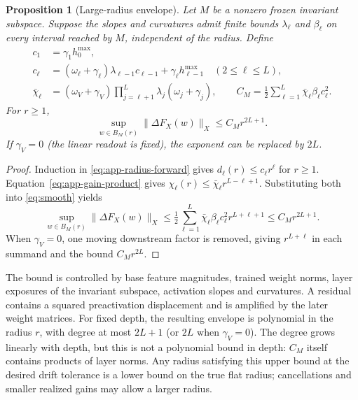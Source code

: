 \documentclass[twoside]{article}
\newtheorem{proposition}[theorem]{Proposition}
\theoremstyle{remark}
\theoremstyle{highlightdefinition}
\theoremstyle{remark}
\begin{document}
\begin{proposition}[Large-radius envelope]\label{prop:app-large-radius}
Let $M$ be a nonzero frozen invariant subspace. Suppose the slopes and curvatures admit finite bounds $\lambda_\ell$ and $\beta_\ell$ on every interval reached by $M$, independent of the radius. Define
\begin{align*}
 c_1&=\gamma_1h_0^{\max},\\
 c_\ell&=(\omega_\ell+\gamma_\ell)\lambda_{\ell-1}c_{\ell-1}
                    +\gamma_\ell h_{\ell-1}^{\max}\quad(2\le\ell\le L),\\
 \bar\chi_\ell&=(\omega_V+\gamma_V)\prod_{j=\ell+1}^L\lambda_j(\omega_j+\gamma_j),\qquad
 C_M=\tfrac12\sum_{\ell=1}^L\bar\chi_\ell\beta_\ell c_\ell^2.
\end{align*}
For $r\ge1$,
\[
 \sup_{w\in B_M(r)}\|\Delta F_X(w)\|_X\le C_Mr^{2L+1}.
\]
If $\gamma_V=0$ (the linear readout is fixed), the exponent can be replaced by $2L$.
\end{proposition}
\begin{proof}
Induction in \eqref{eq:app-radius-forward} gives $d_\ell(r)\le c_\ell r^\ell$ for $r\ge1$. Equation~\eqref{eq:app-gain-product} gives $\chi_\ell(r)\le\bar\chi_\ell r^{L-\ell+1}$. Substituting both into \eqref{eq:smooth} yields
\[
 \sup_{w\in B_M(r)}\|\Delta F_X(w)\|_X
 \le\tfrac12\sum_{\ell=1}^L\bar\chi_\ell\beta_\ell c_\ell^2r^{L+\ell+1}
 \le C_Mr^{2L+1}.
\]
When $\gamma_V=0$, one moving downstream factor is removed, giving $r^{L+\ell}$ in each summand and the bound $C_Mr^{2L}$.
\end{proof}
The bound is controlled by base feature magnitudes, trained weight norms, layer exposures of the invariant subspace, activation slopes and curvatures. A residual contains a squared preactivation displacement and is amplified by the later weight matrices. For fixed depth, the resulting envelope is polynomial in the radius $r$, with degree at most $2L+1$ (or $2L$ when $\gamma_V=0$). The degree grows linearly with depth, but this is not a polynomial bound in depth: $C_M$ itself contains products of layer norms. Any radius satisfying this upper bound at the desired drift tolerance is a lower bound on the true flat radius; cancellations and smaller realized gains may allow a larger radius.
\end{document}
